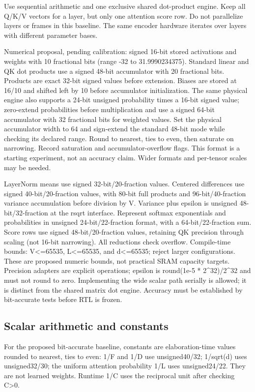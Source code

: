 \documentclass[11pt,a4paper]{article}
\begin{document}
Use sequential arithmetic and one exclusive shared dot-product engine. Keep all Q/K/V vectors for a layer, but only one attention score row. Do not parallelize layers or frames in this baseline. The same encoder hardware iterates over layers with different parameter bases.

Numerical proposal, pending calibration: signed 16-bit stored activations and weights with 10 fractional bits (range -32 to 31.9990234375). Standard linear and QK dot products use a signed 48-bit accumulator with 20 fractional bits. Products are exact 32-bit signed values before extension. Biases are stored at 16/10 and shifted left by 10 before accumulator initialization. The same physical engine also supports a 24-bit unsigned probability times a 16-bit signed value; zero-extend probabilities before multiplication and use a signed 64-bit accumulator with 32 fractional bits for weighted values. Set the physical accumulator width to 64 and sign-extend the standard 48-bit mode while checking its declared range. Round to nearest, ties to even, then saturate on narrowing. Record saturation and accumulator-overflow flags. This format is a starting experiment, not an accuracy claim. Wider formats and per-tensor scales may be needed.

LayerNorm means use signed 32-bit/20-fraction values. Centered differences use signed 40-bit/20-fraction values, with 80-bit full products and 96-bit/40-fraction variance accumulation before division by V. Variance plus epsilon is unsigned 48-bit/32-fraction at the rsqrt interface. Represent softmax exponentials and probabilities in unsigned 24-bit/22-fraction format, with a 64-bit/22-fraction sum. Score rows use signed 48-bit/20-fraction values, retaining QK precision through scaling (not 16-bit narrowing). All reductions check overflow. Compile-time bounds: V<=65535, L<=65535, and d<=65535; reject larger configurations. These are proposed numeric bounds, not practical SRAM capacity targets. Precision adapters are explicit operations; epsilon is round(1e-5 * 2\textasciicircum{}32)/2\textasciicircum{}32 and must not round to zero. Implementing the wide scalar path serially is allowed; it is distinct from the shared matrix dot engine. Accuracy must be established by bit-accurate tests before RTL is frozen.

\subsection{Scalar arithmetic and constants}
For the proposed bit-accurate baseline, constants are elaboration-time values rounded to nearest, ties to even: 1/F and 1/D use unsigned40/32; 1/sqrt(d) uses unsigned32/30; the uniform attention probability 1/L uses unsigned24/22. They are not learned weights. Runtime 1/C uses the reciprocal unit after checking C>0.
\end{document}
